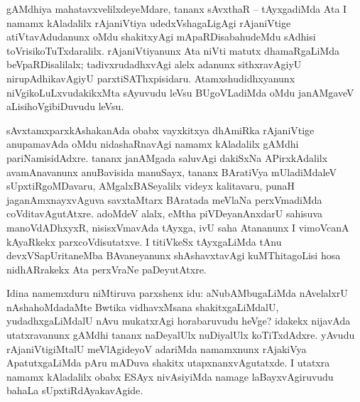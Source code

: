 gAMdhiya mahatavxvelilxdeyeMdare, tananx sAvxthaR -- tAyxgadiMda Ata I namamx kAla\-dalilx rAjaniVtiya udedxVshagaLigAgi rAjaniVtige atiVtavAdudanunx oMdu shakitxyAgi mApaRDisabahudeMdu sAdhisi toVrisikoTuTxdaralilx. rAjaniVtiyanunx Ata niVti matutx dhamaRgaLiMda beVpaRDisalilalx; tadivxrudadhxvAgi alelx adanunx sithxravAgiyU nirupAdhika\-vAgiyU parxtiSAThxpisidaru. Atamxshudidhxyanunx niVgikoLuLxvudakikxMta sAyuvudu leVsu BUgoVLadiMda oMdu janAMgaveV aLisihoVgibiDuvudu leVsu.

sAvxtamxparxkAshakanAda obabx vayxkitxya dhAmiRka rAjaniVtige anupamavAda oMdu nidashaRnavAgi namamx kAladalilx gAMdhi pariNamisidAdxre. tananx janAMgada saluvAgi dakiSxNa APirxkAdalilx avamAnavanunx anuBavisida manuSayx, tananx BAratiVya mUladiMdaleV sUpxtiRgoMDavaru, AMgalxBASeyalilx videyx kalitavaru, punaH jaganAmxnayxvAguva savxtaMtarx BAratada meVlaNa perxVmadiMda coVditavAgutAtxre. adoMdeV alalx, eMtha piVDeyanAnxdarU sahisuva manoVdADhxyxR, nisisxVmavAda tAyxga, ivU saha Atananunx I vimoVcanA kAyaRkekx parxcoVdisutatxve. I titiVkeSx tAyxgaLiMda tAnu devxVSapUritaneMba BAvaneyanunx shAshavxtavAgi kuMThitagoLisi hosa nidhARrakekx Ata perxVraNe paDeyutAtxre.

Idina namemxduru niMtiruva parxshenx idu: aNubAMbugaLiMda nAvelalxrU nAshahoMdadaMte Bwtika vidhavxMsana shakitxgaLiMdalU, yudadhxgaLiMdalU nAvu mukatxrAgi horabaruvudu heVge? idakekx nijavAda utatxravanunx gAMdhi tananx naDeyalUlx nuDiyalUlx koTiTxdAdxre. yAvudu rAjaniVtigiMtalU meVlAgideyoV adariMda namamxnunx rAjakiVya ApatutxgaLiMda pAru mADuva shakitx utapxnanxvAgutatxde. I utatxra namamx kAladalilx obabx ESAyx nivAsiyiMda namage laBayxvAgiruvudu bahaLa sUpxtiRdAyakavAgide.


